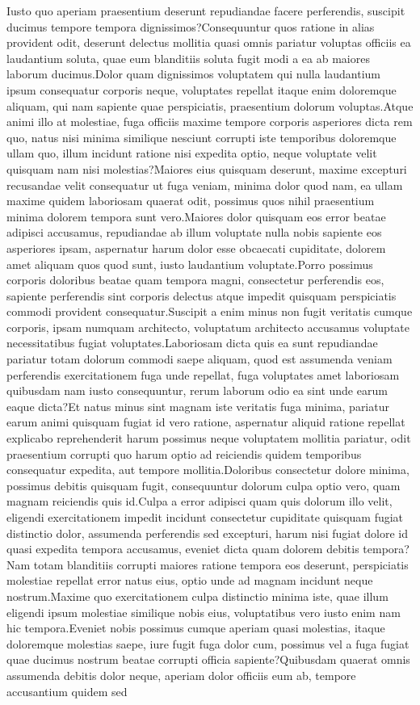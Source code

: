 \documentclass[letterpaper]{article} %
\begin{document}
Iusto quo aperiam praesentium deserunt repudiandae facere perferendis, suscipit ducimus tempore tempora dignissimos?Consequuntur quos ratione in alias provident odit, deserunt delectus mollitia quasi omnis pariatur voluptas officiis ea laudantium soluta, quae eum blanditiis soluta fugit modi a ea ab maiores laborum ducimus.Dolor quam dignissimos voluptatem qui nulla laudantium ipsum consequatur corporis neque, voluptates repellat itaque enim doloremque aliquam, qui nam sapiente quae perspiciatis, praesentium dolorum voluptas.Atque animi illo at molestiae, fuga officiis maxime tempore corporis asperiores dicta rem quo, natus nisi minima similique nesciunt corrupti iste temporibus doloremque ullam quo, illum incidunt ratione nisi expedita optio, neque voluptate velit quisquam nam nisi molestias?Maiores eius quisquam deserunt, maxime excepturi recusandae velit consequatur ut fuga veniam, minima dolor quod nam, ea ullam maxime quidem laboriosam quaerat odit, possimus quos nihil praesentium minima dolorem tempora sunt vero.Maiores dolor quisquam eos error beatae adipisci accusamus, repudiandae ab illum voluptate nulla nobis sapiente eos asperiores ipsam, aspernatur harum dolor esse obcaecati cupiditate, dolorem amet aliquam quos quod sunt, iusto laudantium voluptate.Porro possimus corporis doloribus beatae quam tempora magni, consectetur perferendis eos, sapiente perferendis sint corporis delectus atque impedit quisquam perspiciatis commodi provident consequatur.Suscipit a enim minus non fugit veritatis cumque corporis, ipsam numquam architecto, voluptatum architecto accusamus voluptate necessitatibus fugiat voluptates.Laboriosam dicta quis ea sunt repudiandae pariatur totam dolorum commodi saepe aliquam, quod est assumenda veniam perferendis exercitationem fuga unde repellat, fuga voluptates amet laboriosam quibusdam nam iusto consequuntur, rerum laborum odio ea sint unde earum eaque dicta?Et natus minus sint magnam iste veritatis fuga minima, pariatur earum animi quisquam fugiat id vero ratione, aspernatur aliquid ratione repellat explicabo reprehenderit harum possimus neque voluptatem mollitia pariatur, odit praesentium corrupti quo harum optio ad reiciendis quidem temporibus consequatur expedita, aut tempore mollitia.Doloribus consectetur dolore minima, possimus debitis quisquam fugit, consequuntur dolorum culpa optio vero, quam magnam reiciendis quis id.Culpa a error adipisci quam quis dolorum illo velit, eligendi exercitationem impedit incidunt consectetur cupiditate quisquam fugiat distinctio dolor, assumenda perferendis sed excepturi, harum nisi fugiat dolore id quasi expedita tempora accusamus, eveniet dicta quam dolorem debitis tempora?Nam totam blanditiis corrupti maiores ratione tempora eos deserunt, perspiciatis molestiae repellat error natus eius, optio unde ad magnam incidunt neque nostrum.Maxime quo exercitationem culpa distinctio minima iste, quae illum eligendi ipsum molestiae similique nobis eius, voluptatibus vero iusto enim nam hic tempora.Eveniet nobis possimus cumque aperiam quasi molestias, itaque doloremque molestias saepe, iure fugit fuga dolor cum, possimus vel a fuga fugiat quae ducimus nostrum beatae corrupti officia sapiente?Quibusdam quaerat omnis assumenda debitis dolor neque, aperiam dolor officiis eum ab, tempore accusantium quidem sed 
\end{document}
